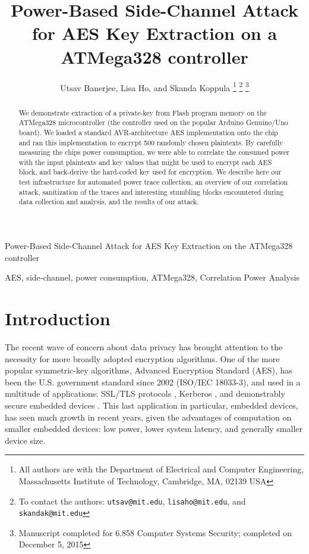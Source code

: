 \documentclass[journal]{ieee_style}
\begin{document}
\title{Power-Based Side-Channel Attack for AES Key Extraction on a ATMega328 controller}

\author{Utsav Banerjee,
        Lisa Ho,
        and Skanda Koppula%
\thanks{All authors are with the Department
of Electrical and Computer Engineering, Massachusetts Institute of Technology, Cambridge,
MA, 02139 USA}%
\thanks{To contact the authors: \texttt{utsav@mit.edu}, \texttt{lisaho@mit.edu}, and \texttt{skandak@mit.edu}}%
\thanks{Manuscript completed for 6.858 Computer Systems Security; completed on December 5, 2015}}


%
{Power-Based Side-Channel Attack for AES Key Extraction on the ATMega328 controller}
\maketitle

\begin{abstract}
    We demonstrate extraction of a private-key from Flash program memory on the ATMega328 microcontroller (the controller used on the popular Arduino Genuino/Uno board). We loaded a standard AVR-architecture AES implementation onto the chip and ran this implementation to encrypt 500 randomly chosen plaintexts. By carefully measuring the chips power consumption, we were able to correlate the consumed power with the input plaintexts and key values that might be used to encrypt each AES block, and back-derive the hard-coded key used for encryption. We describe here our test infrastructure for automated power trace collection, an overview of our correlation attack, sanitization of the traces and interesting stumbling blocks encountered during data collection and analysis, and the results of our attack.
\end{abstract}

\begin{IEEEkeywords}
AES, side-channel, power consumption, ATMega328, Correlation Power Analysis
\end{IEEEkeywords}

\section{Introduction}
The recent wave of concern about data privacy has brought attention to the necessity for more broadly adopted encryption algorithms. One of the more popular symmetric-key algorithms, Advanced Encryption Standard (AES), has been the U.S. government standard since 2002 (ISO/IEC 18033-3), and used in a multitude of applications: SSL/TLS protocols \cite{ssl}, Kerberos \cite{kerberos}, and demonstrably secure embedded devices \cite{embedded}. This last application in particular, embedded devices, has seen much growth in recent years, given the advantages of computation on smaller embedded devices: low power, lower system latency, and generally smaller device size.
\end{document}
